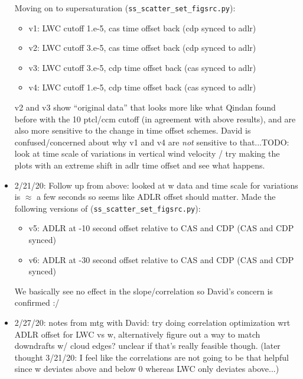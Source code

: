 \documentclass{article}
\begin{document}
\begin{itemize}
	Moving on to supersaturation (\texttt{ss\_scatter\_set\_figsrc.py}):
	\begin{itemize}
		\item v1: LWC cutoff 1.e-5, cas time offset back (cdp synced to adlr)
		\item v2: LWC cutoff 3.e-5, cas time offset back (cdp synced to adlr)
		\item v3: LWC cutoff 3.e-5, cdp time offset back (cas synced to adlr)
		\item v4: LWC cutoff 1.e-5, cdp time offset back (cas synced to adlr)
	\end{itemize}
	v2 and v3 show ``original data'' that looks more like what Qindan found before with the 10 ptcl/ccm cutoff (in agreement with above results), and are also more sensitive to the change in time offset schemes. David is confused/concerned about why v1 and v4 are \emph{not} sensitive to that...TODO: look at time scale of variations in vertical wind velocity / try making the plots with an extreme shift in adlr time offset and see what happens.
	\item 2/21/20: Follow up from above: looked at w data and time scale for variations is $\approx$ a few seconds so seems like ADLR offset should matter. Made the following versions of (\texttt{ss\_scatter\_set\_figsrc.py}):
	\begin{itemize}
		\item v5: ADLR at -10 second offset relative to CAS and CDP (CAS and CDP synced)
		\item v6: ADLR at -30 second offset relative to CAS and CDP (CAS and CDP synced)
	\end{itemize}
	We basically see no effect in the slope/correlation so David's concern is confirmed :/ 
	\item 2/27/20: notes from mtg with David: try doing correlation optimization wrt ADLR offset for LWC vs w, alternatively figure out a way to match downdrafts w/ cloud edges? unclear if that's really feasible though. (later thought 3/21/20: I feel like the correlations are not going to be that helpful since w deviates above and below 0 whereas LWC only deviates above...)
\end{itemize}
\end{document}
